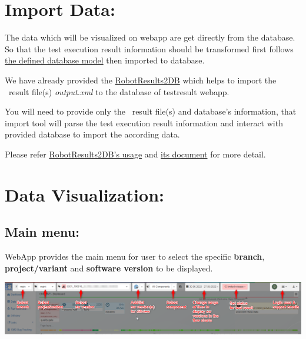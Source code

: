 \hypertarget{import-data}{%
\section{Import Data:}\label{import-data}}

The data which will be visualized on webapp are get directly from the database.
So that the test execution result information should be transformed first 
follows \href{https://github.com/test-fullautomation/testresultwebapp/blob/
develop/TestResultWebApp/mysql_server/datamodel/datamodel.svg}
{the defined database model} then imported to database.

We have already provided the \href{https://github.com/test-fullautomation/
robotframework-testresultwebapptool}{RobotResults2DB} which helps to import the
\rfwcore\ result file(s) \emph{output.xml} to the database of testresult webapp.

You will need to provide only the \rfwcore\ result file(s) and database's 
information, that import tool will parse the test execution result information 
and interact with provided database to import the according data.

Please refer \href{https://github.com/test-fullautomation/
robotframework-testresultwebapptool#usage}{RobotResults2DB's usage} and 
\href{https://github.com/test-fullautomation/robotframework-
testresultwebapptool/blob/develop/RobotResults2DB/RobotResults2DB.pdf}
{its document} for more detail.


\hypertarget{data-visualization}{%
\section{Data Visualization:}\label{data-visualization}}

\hypertarget{main-menu}{%
\subsection{Main menu:}\label{main-menu}}
WebApp provides the main menu for user to select the specific \textbf{branch}, 
\textbf{project/variant} and \textbf{software version} to be displayed.

\includegraphics[width=1\linewidth]{./pictures/main-menu.png}

